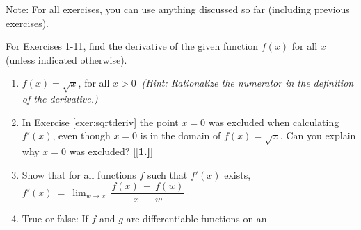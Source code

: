 \divider
\vspace{3mm}
\startexercises\label{sec1dot2}
{\small
\par\noindent Note: For all exercises, you can use anything
discussed so far (including previous exercises).\vspace{2mm}
\par\noindent For Exercises 1-11, find the derivative of the
given function $f(x)$ for all $x$ (unless indicated otherwise).
\begin{enumerate}[\bfseries 1.]
 \item\label{exer:sqrtderiv} $f(x) = \sqrt{x}$, for all $x > 0~$ \emph{(Hint:
 Rationalize the numerator in the definition of the derivative.)}
 \item In Exercise \ref{exer:sqrtderiv} the point $x=0$ was excluded when
 calculating $f'(x)$, even though $x=0$ is in the domain of $f(x) = \sqrt{x}$.
 Can you explain why $x=0$ was excluded?
[{[\bfseries 1.]}]
 \item Show that for all functions $f$ such that $f'(x)$ exists,
$f'(x) ~=~ \displaystyle\lim_{w \to x} ~\dfrac{f(x) ~-~ f(w)}{x ~-~ w} ~$.
 \item True or false: If $f$ and $g$ are differentiable functions on an

\end{enumerate}}
